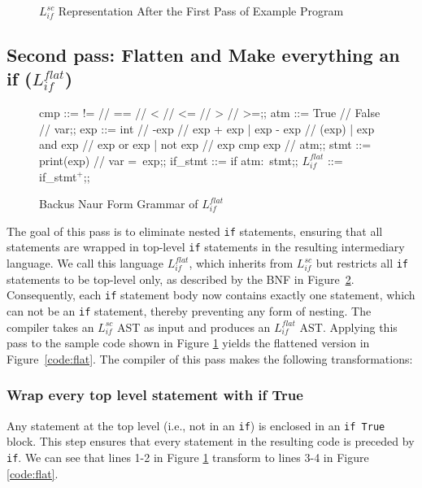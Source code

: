 \begin{figure}[h]
	\centering
	
	\caption{$L_{if}^{sc}$ Representation After the First Pass of Example Program}
	\label{code:sc}
\end{figure}


\subsection{Second pass: Flatten and Make everything an if ($L_{if}^{flat}$)} \label{subsec:flatten}
\begin{figure}[h!]
	\centering
	\begin{bnf}[row{-} = {bg = gray9}]
		cmp ::= != // == // < // <= // > // >=;;
		atm ::= True // False // var;;
		exp ::= int  // -exp // exp + exp 
		| exp - exp // (exp)
		| exp and exp // exp or exp 
		| not exp // exp cmp exp // atm;;
		stmt ::= print(exp) // var = exp;;
		if\_stmt ::= if atm$\colon$ stmt;;
		$L_{if}^{flat}$ ::= if\_stmt$^+$;;
	\end{bnf}
	\caption{Backus Naur Form Grammar of $L_{if}^{flat}$}
	\label{bnf:flat}
\end{figure}

The goal of this pass is to eliminate nested \texttt{if} statements, ensuring that all statements are wrapped in top-level \texttt{if} statements in the resulting intermediary language. We call this language $L_{if}^{flat}$, which inherits from $L_{if}^{sc}$ but restricts all \texttt{if} statements to be top-level only, as described by the BNF in Figure~\ref{bnf:flat}. Consequently, each \texttt{if} statement body now contains exactly one statement, which can not be an \texttt{if} statement, thereby preventing any form of nesting. The compiler takes an $L_{if}^{sc}$ AST as input and produces an $L_{if}^{flat}$ AST. Applying this pass to the sample code shown in Figure \ref{code:sc} yields the flattened version in Figure~\ref{code:flat}. The compiler of this pass makes the following transformations:

\subsubsection{Wrap every top level statement with if True} Any statement at the top level (i.e., not in an \texttt{if}) is enclosed in an \texttt{if True} block. This step ensures that every statement in the resulting code is preceded by \texttt{if}. We can see that lines 1-2 in Figure \ref{code:sc} transform to lines 3-4 in Figure \ref{code:flat}.

